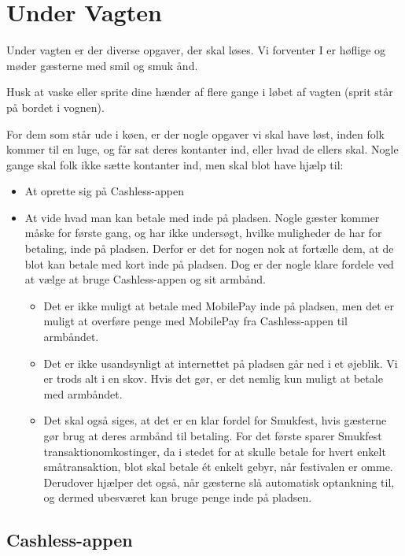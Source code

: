 \section{Under Vagten}
\label{sec:intra-barvagten}

Under vagten er der diverse opgaver, der skal løses. 
Vi forventer I er høflige og møder gæsterne med smil og smuk ånd.

Husk at vaske eller sprite dine hænder af flere gange 
i løbet af vagten (sprit står på bordet i vognen).

For dem som står ude i køen, er der nogle opgaver vi skal have løst, inden folk kommer til 
en luge, og får sat deres kontanter ind, eller hvad de ellers skal.
Nogle gange skal folk ikke sætte kontanter ind, men skal blot have hjælp til:
\begin{itemize}
  \item At oprette sig på Cashless-appen
  \item At vide hvad man kan betale med inde på pladsen. Nogle gæster kommer måske for første gang, 
  og har ikke undersøgt, hvilke muligheder de har for betaling, inde på pladsen.
  Derfor er det for nogen nok at fortælle dem, at de blot kan betale med kort inde på pladsen.
  Dog er der nogle klare fordele ved at vælge at bruge Cashless-appen og sit armbånd.
  \begin{itemize}
    \item Det er ikke muligt at betale med MobilePay inde på pladsen, men det er muligt at 
    overføre penge med MobilePay fra Cashless-appen til armbåndet.
    \item Det er ikke usandsynligt at internettet på pladsen går ned i et øjeblik. Vi er 
    trods alt i en skov. Hvis det gør, er det nemlig kun muligt at betale med armbåndet.
    \item Det skal også siges, at det er en klar fordel for Smukfest, hvis gæsterne gør brug at 
    deres armbånd til betaling. For det første sparer Smukfest transaktionomkostinger, da i stedet for 
    at skulle betale for hvert enkelt småtransaktion, blot skal betale ét enkelt gebyr, når festivalen er omme. 
    Derudover hjælper det også, når gæsterne slå automatisk optankning til, og dermed ubesværet
    kan bruge penge inde på pladsen.
  \end{itemize}
\end{itemize}

\subsection{Cashless-appen}

